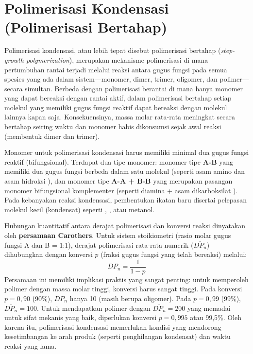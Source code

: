 \documentclass[12pt,a4paper,openany]{book}
\begin{document}
\section{Polimerisasi Kondensasi (Polimerisasi Bertahap)}

Polimerisasi kondensasi, atau lebih tepat disebut polimerisasi bertahap (\textit{step-growth polymerization}), merupakan mekanisme polimerisasi di mana pertumbuhan rantai terjadi melalui reaksi antara gugus fungsi pada semua spesies yang ada dalam sistem---monomer, dimer, trimer, oligomer, dan polimer---secara simultan. Berbeda dengan polimerisasi berantai di mana hanya monomer yang dapat bereaksi dengan rantai aktif, dalam polimerisasi bertahap setiap molekul yang memiliki gugus fungsi reaktif dapat bereaksi dengan molekul lainnya kapan saja. Konsekuensinya, massa molar rata-rata meningkat secara bertahap seiring waktu dan monomer habis dikonsumsi sejak awal reaksi (membentuk dimer dan trimer).

Monomer untuk polimerisasi kondensasi harus memiliki minimal dua gugus fungsi reaktif (bifungsional). Terdapat dua tipe monomer: monomer tipe \textbf{A-B} yang memiliki dua gugus fungsi berbeda dalam satu molekul (seperti asam amino  dan asam hidroksi ), dan monomer tipe \textbf{A-A + B-B} yang merupakan pasangan monomer bifungsional komplementer (seperti diamina  + asam dikarboksilat ). Pada kebanyakan reaksi kondensasi, pembentukan ikatan baru disertai pelepasan molekul kecil (kondensat) seperti , , atau metanol.

Hubungan kuantitatif antara derajat polimerisasi dan konversi reaksi dinyatakan oleh \textbf{persamaan Carothers}. Untuk sistem stoikiometri (rasio molar gugus fungsi A dan B = 1:1), derajat polimerisasi rata-rata numerik ($\overline{DP_n}$) dihubungkan dengan konversi $p$ (fraksi gugus fungsi yang telah bereaksi) melalui:
\begin{equation}
  \overline{DP_n} = \frac{1}{1-p}
\end{equation}
Persamaan ini memiliki implikasi praktis yang sangat penting: untuk memperoleh polimer dengan massa molar tinggi, konversi harus sangat tinggi. Pada konversi $p = 0,90$ (90\%), $\overline{DP_n}$ hanya 10 (masih berupa oligomer). Pada $p = 0,99$ (99\%), $\overline{DP_n} = 100$. Untuk mendapatkan polimer dengan $\overline{DP_n} = 200$ yang memadai untuk sifat mekanis yang baik, diperlukan konversi $p = 0,995$ atau 99,5\%. Oleh karena itu, polimerisasi kondensasi memerlukan kondisi yang mendorong kesetimbangan ke arah produk (seperti penghilangan kondensat) dan waktu reaksi yang lama.
\end{document}
